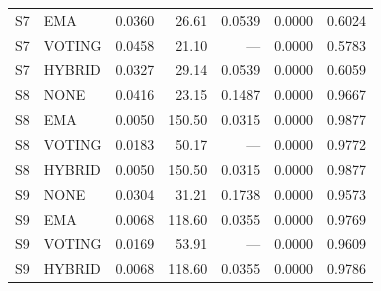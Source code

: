 \begin{tabular}{llrrrrr}
S7 & EMA & 0.0360 & 26.61 & 0.0539 & 0.0000 & 0.6024\\
S7 & VOTING & 0.0458 & 21.10 & --- & 0.0000 & 0.5783\\
S7 & HYBRID & 0.0327 & 29.14 & 0.0539 & 0.0000 & 0.6059\\
S8 & NONE & 0.0416 & 23.15 & 0.1487 & 0.0000 & 0.9667\\
S8 & EMA & 0.0050 & 150.50 & 0.0315 & 0.0000 & 0.9877\\
S8 & VOTING & 0.0183 & 50.17 & --- & 0.0000 & 0.9772\\
S8 & HYBRID & 0.0050 & 150.50 & 0.0315 & 0.0000 & 0.9877\\
S9 & NONE & 0.0304 & 31.21 & 0.1738 & 0.0000 & 0.9573\\
S9 & EMA & 0.0068 & 118.60 & 0.0355 & 0.0000 & 0.9769\\
S9 & VOTING & 0.0169 & 53.91 & --- & 0.0000 & 0.9609\\
S9 & HYBRID & 0.0068 & 118.60 & 0.0355 & 0.0000 & 0.9786\\
\bottomrule
\end{tabular}
